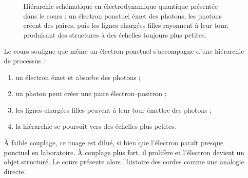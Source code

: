 \begin{figure}[htbp]\centering
{}\caption{Hiérarchie schématique en électrodynamique quantique présentée dans le cours : un électron ponctuel émet des photons, les photons créent des paires, puis les lignes chargées filles rayonnent à leur tour, produisant des structures à des échelles toujours plus petites.}\end{figure}

Le cours souligne que même un électron ponctuel s’accompagne d’une hiérarchie de processus :
\begin{enumerate}
\item un électron émet et absorbe des photons ;
\item un photon peut créer une paire électron--positron ;
\item les lignes chargées filles peuvent à leur tour émettre des photons ;
\item la hiérarchie se poursuit vers des échelles plus petites.
\end{enumerate}
À faible couplage, ce nuage est dilué, si bien que l’électron paraît presque ponctuel en laboratoire. À couplage plus fort, il prolifère et l’électron devient un objet structuré. Le cours présente alors l’histoire des cordes comme une analogie directe.

